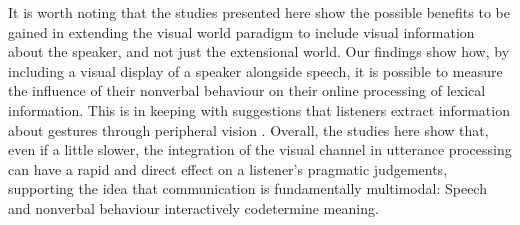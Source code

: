 \documentclass[a4paper,man,natbib]{apa6}
\begin{document}
It is worth noting that the studies presented here show the possible benefits to be gained in extending the visual world paradigm to include visual information about the speaker, and not just the extensional world. %
Our findings show how, by including a visual display of a speaker alongside speech, it is possible to measure the influence of their nonverbal behaviour on their online processing of lexical information.
This is in keeping with suggestions that listeners extract information about gestures through peripheral vision \citep[See e.g.][]{Gullberg2006}. %
Overall, the studies here show that, even if a little slower, the integration of the visual channel in utterance processing can have a rapid and direct effect on a listener's pragmatic judgements, supporting the idea that communication is fundamentally multimodal: 
Speech and nonverbal behaviour interactively codetermine meaning.


\end{document}
